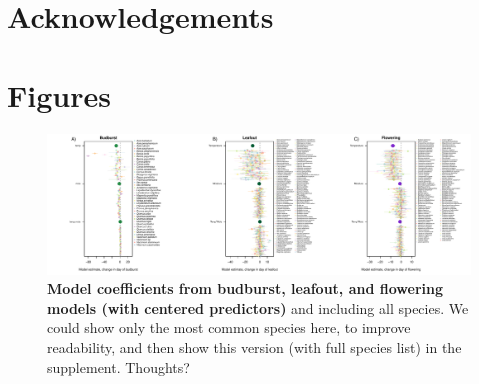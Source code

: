\documentclass{article}
\begin{document}



\section* {Acknowledgements}




\section*{Figures}


\begin{figure}[h]
\centering
 \includegraphics{../../Analyses/soilmoisture/figures/m5_bbdlofl.pdf}
 \caption{\textbf{Model coefficients from budburst, leafout, and flowering models (with centered predictors)} and including all species. We could show only the most common species here, to improve readability, and then show this version (with full species list) in the supplement. Thoughts?} 
 \label{fig:bblofl}
 \end{figure}
 
\end{document}
